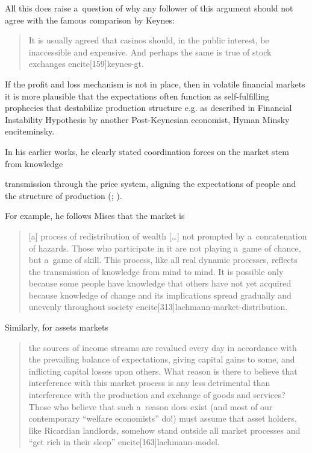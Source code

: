 {\begin{quote}
\end{quote}

All this does raise a~question of why any follower of this argument should not agree with the famous comparison by Keynes:

\begin{quote}

It is usually agreed that casinos should, in the public interest, be inaccessible and expensive. And perhaps the same is true of stock exchanges encite[159]{keynes-gt}.

\end{quote}

If the profit and loss mechanism is not in place, then in volatile financial markets it is more plausible that the expectations often function as self-fulfilling prophecies that destabilize production structure e.g. as described in Financial Instability Hypothesis by another Post-Keynesian economist, Hyman Minsky encite{minsky}.



In his earlier works, he clearly stated coordination forces on the market stem from knowledge

transmission through the price system, aligning the expectations of people and the structure of production (\cite[103]{lachmann-ha}; \citeyear[62]{lachmann1956capital}).

For example, he follows Mises that the market is

\begin{quote}

[a] process of redistribution of wealth [\ldots] not prompted by a~concatenation of hazards. Those who participate in it are not playing a~game of chance, but a~game of skill. This process, like all real dynamic processes, reflects the transmission of knowledge from mind to mind. It is possible only because some people have knowledge that others have not yet acquired because knowledge of change and its implications spread gradually and unevenly throughout society encite[313]{lachmann-market-distribution}.

\end{quote}

Similarly, for assets markets

\begin{quote}

the sources of income streams are revalued every day in accordance with the prevailing balance of expectations, giving capital gains to some, and inflicting capital losses upon others. What reason is there to believe that interference with this market process is any less detrimental than interference with the production and exchange of goods and services? Those who believe that such a~reason does exist (and most of our contemporary ``welfare economists'' do!) must assume that asset holders, like Ricardian landlords, somehow stand outside all market processes and ``get rich in their sleep'' encite[163]{lachmann-model}.


\end{quote}}
